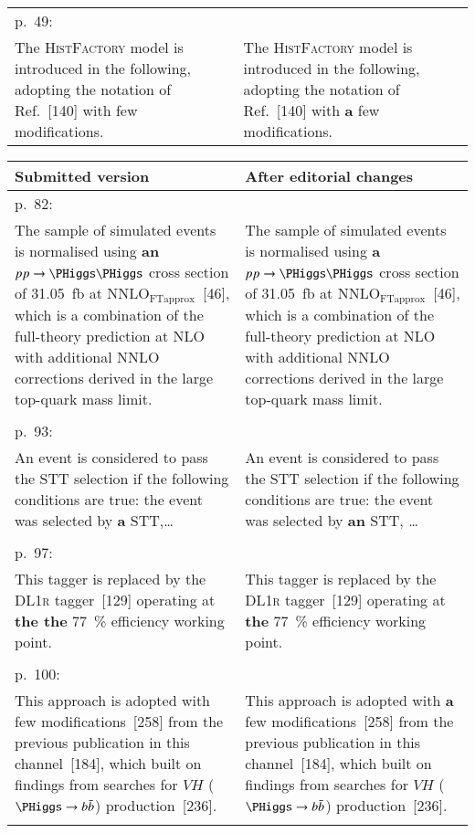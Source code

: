 \documentclass[fontsize=11pt, paper=a4]{scrartcl}
\begin{document}
\begin{center}
\begin{tabular}{p{}@{\hskip 0.05\textwidth}p{}}
  p.\ 49: &\\
  The \textsc{HistFactory} model is introduced in the following, adopting the notation of Ref.~[140] with few modifications. &
  The \textsc{HistFactory} model is introduced in the following, adopting the notation of Ref.~[140] with \textbf{a} few modifications.\\

  \bottomrule
\end{tabular}
\end{center}

\begin{center}
  \begin{tabular}{p{}@{\hskip 0.05\textwidth}p{}}
  \toprule
  Submitted version & After editorial changes\\
    \midrule

  p.\ 82: &\\
  The sample of simulated events is normalised using \textbf{an} $\pp \to \HH$ cross section of \SI{31.05}{\femto\barn} at $\text{NNLO}_{\text{FTapprox}}$~[46], which is a combination of the full-theory prediction at NLO with additional NNLO corrections derived in the large top-quark mass limit. &
  The sample of simulated events is normalised using \textbf{a} $\pp \to \HH$ cross section of \SI{31.05}{\femto\barn} at $\text{NNLO}_{\text{FTapprox}}$~[46], which is a combination of the full-theory prediction at NLO with additional NNLO corrections derived in the large top-quark mass limit.\\\\

  p.\ 93: &\\
  An event is considered to pass the STT selection if the following conditions are true: the event was selected by \textbf{a} STT,\dots &
  An event is considered to pass the STT selection if the following conditions are true: the event was selected by \textbf{an} STT, \dots\\\\

  p.\ 97: &\\
  This tagger is replaced by the \textsc{DL1r} tagger~[129] operating at \textbf{the the} \SI{77}{\percent} efficiency working point. &
  This tagger is replaced by the \textsc{DL1r} tagger~[129] operating at \textbf{the} \SI{77}{\percent} efficiency working point.\\\\

  p.\ 100: &\\
  This approach is adopted with few modifications~[258] from the previous publication in this channel~[184], which built on findings from searches for $VH$ ($\PHiggs \to \bbbar$) production~[236]. &
  This approach is adopted with \textbf{a} few modifications~[258] from the previous publication in this channel~[184], which built on findings from searches for $VH$ ($\PHiggs \to \bbbar$) production~[236]. \\\\


\end{tabular}
\end{center}
\end{document}

